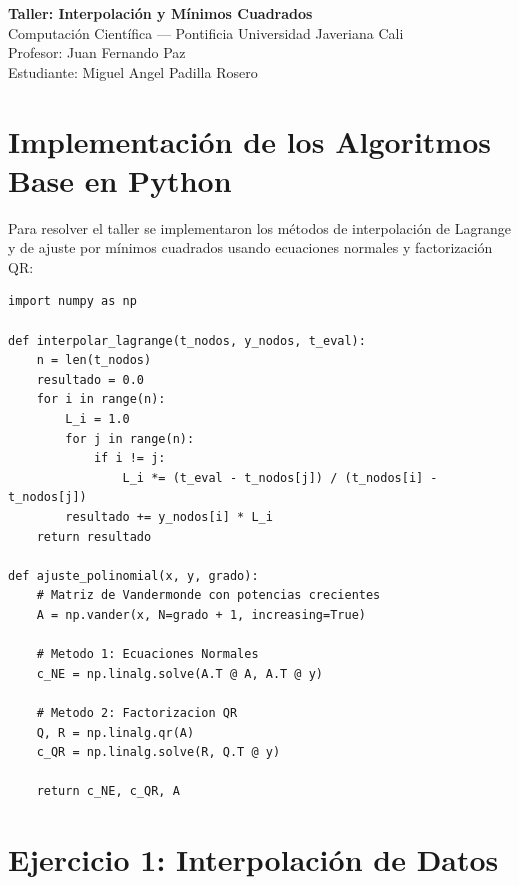 \documentclass[11pt,a4paper]{article}
\begin{document}
\begin{center}
    {\LARGE\bfseries\color{pujblue} Taller: Interpolación y Mínimos Cuadrados}\\[0.3cm]
    {\large Computación Científica --- Pontificia Universidad Javeriana Cali}\\[0.1cm]
    {\normalsize Profesor: Juan Fernando Paz}\\[0.1cm]
    {\normalsize Estudiante: Miguel Angel Padilla Rosero}
\end{center}
\vspace{0.3cm}

\section{Implementación de los Algoritmos Base en Python}

Para resolver el taller se implementaron los métodos de interpolación de Lagrange y de ajuste por mínimos cuadrados usando ecuaciones normales y factorización QR:

\begin{lstlisting}
import numpy as np

def interpolar_lagrange(t_nodos, y_nodos, t_eval):
    n = len(t_nodos)
    resultado = 0.0
    for i in range(n):
        L_i = 1.0
        for j in range(n):
            if i != j:
                L_i *= (t_eval - t_nodos[j]) / (t_nodos[i] - t_nodos[j])
        resultado += y_nodos[i] * L_i
    return resultado

def ajuste_polinomial(x, y, grado):
    # Matriz de Vandermonde con potencias crecientes
    A = np.vander(x, N=grado + 1, increasing=True)
    
    # Metodo 1: Ecuaciones Normales
    c_NE = np.linalg.solve(A.T @ A, A.T @ y)
    
    # Metodo 2: Factorizacion QR
    Q, R = np.linalg.qr(A)
    c_QR = np.linalg.solve(R, Q.T @ y)
    
    return c_NE, c_QR, A
\end{lstlisting}

\section{Ejercicio 1: Interpolación de Datos}
\end{document}
